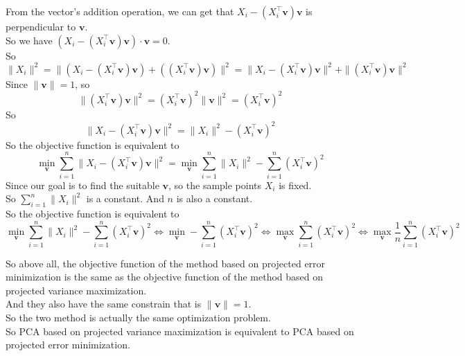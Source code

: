 \documentclass[10pt]{article}
\begin{document}
\begin{enumerate}[1.]
From the vector's addition operation, we can get that $X_i-(X_i^{\top}\mathbf{v})\mathbf{v}$ is perpendicular to $\mathbf{v}$.\\
So we have $(X_i-(X_i^{\top}\mathbf{v})\mathbf{v})\cdot \mathbf{v}=0$.\\
So $$\|X_i\|^2=\|(X_i-(X_i^{\top}\mathbf{v})\mathbf{v})+((X_i^{\top}\mathbf{v})\mathbf{v})\|^2=\|X_i-(X_i^{\top}\mathbf{v})\mathbf{v}\|^2+\|(X_i^{\top}\mathbf{v})\mathbf{v}\|^2$$
Since $\|\mathbf{v}\|=1$, so $$\|(X_i^{\top}\mathbf{v})\mathbf{v}\|^2=(X_i^{\top}\mathbf{v})^2\|\mathbf{v}\|^2=(X_i^{\top}\mathbf{v})^2$$
So $$\|X_i-(X_i^{\top}\mathbf{v})\mathbf{v}\|^2=\|X_i\|^2-(X_i^{\top}\mathbf{v})^2$$
So the objective function is equivalent to
$$\min_{\mathbf{v}} \sum\limits_{i=1}^n \|X_i-(X_i^{\top}\mathbf{v})\mathbf{v}\|^2=\min_{\mathbf{v}} \sum\limits_{i=1}^n \|X_i\|^2-\sum\limits_{i=1}^n(X_i^{\top}\mathbf{v})^2$$
Since our goal is to find the suitable $\mathbf{v}$, so the sample points $X_i$ is fixed.\\
So $\sum\limits_{i=1}^n \|X_i\|^2$ is a constant. And $n$ is also a constant.\\
So the objective function is equivalent to
$$\min_{\mathbf{v}} \sum\limits_{i=1}^n \|X_i\|^2-\sum\limits_{i=1}^n(X_i^{\top}\mathbf{v})^2\Leftrightarrow \min_{\mathbf{v}} -\sum\limits_{i=1}^n(X_i^{\top}\mathbf{v})^2\Leftrightarrow \max_{\mathbf{v}}\sum\limits_{i=1}^n(X_i^{\top}\mathbf{v})^2\Leftrightarrow \max_{\mathbf{v}}\dfrac{1}{n}\sum\limits_{i=1}^n(X_i^{\top}\mathbf{v})^2 $$


So above all, the objective function of the method based on projected error minimization is the same as the objective function of the method based on projected variance maximization.\\
And they also have the same constrain that is $\|\mathbf{v}\|=1$.\\
So the two method is actually the same optimization problem.\\
So PCA based on projected variance maximization is equivalent to PCA based on projected error minimization.\\


\end{enumerate}
\end{document}
